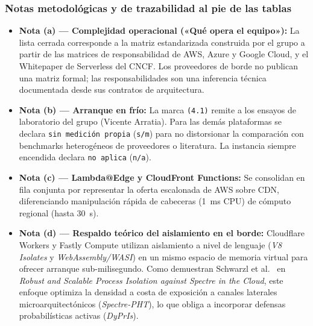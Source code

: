 \documentclass[12pt, letterpaper, table, xcdraw]{inf-pucv}
\begin{document}
\subsubsection*{Notas metodológicas y de trazabilidad al pie de las tablas}
\begin{itemize}
    \item \textbf{Nota (a) --- Complejidad operacional («Qué opera el equipo»):} La lista cerrada corresponde a la matriz estandarizada construida por el grupo a partir de las matrices de responsabilidad de AWS, Azure y Google Cloud, y el Whitepaper de Serverless del CNCF. Los proveedores de borde no publican una matriz formal; las responsabilidades son una inferencia técnica documentada desde sus contratos de arquitectura.
    \item \textbf{Nota (b) --- Arranque en frío:} La marca \texttt{(4.1)} remite a los ensayos de laboratorio del grupo (Vicente Arratia). Para las demás plataformas se declara \texttt{sin medición propia} (\texttt{s/m}) para no distorsionar la comparación con benchmarks heterogéneos de proveedores o literatura. La instancia siempre encendida declara \texttt{no aplica} (\texttt{n/a}).
    \item \textbf{Nota (c) --- Lambda@Edge y CloudFront Functions:} Se consolidan en fila conjunta por representar la oferta escalonada de AWS sobre CDN, diferenciando manipulación rápida de cabeceras (1~ms CPU) de cómputo regional (hasta 30~s).
    \item \textbf{Nota (d) --- Respaldo teórico del aislamiento en el borde:} Cloudflare Workers y Fastly Compute utilizan aislamiento a nivel de lenguaje (\emph{V8 Isolates} y \emph{WebAssembly/WASI}) en un mismo espacio de memoria virtual para ofrecer arranque sub-milisegundo. Como demuestran Schwarzl et al.\ \parencite{schwarzl2022spectre} en \emph{Robust and Scalable Process Isolation against Spectre in the Cloud}, este enfoque optimiza la densidad a costa de exposición a canales laterales microarquitectónicos (\emph{Spectre-PHT}), lo que obliga a incorporar defensas probabilísticas activas (\emph{DyPrIs}).
\end{itemize}

\clearpage

\end{document}
